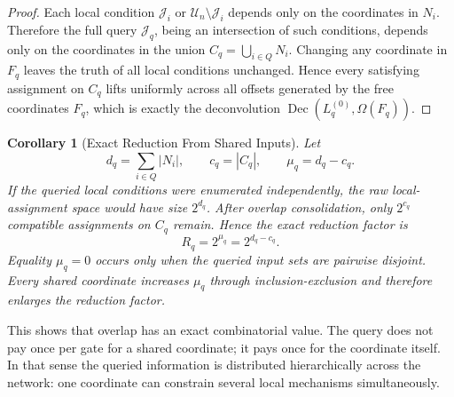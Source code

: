 \documentclass[11pt]{article}
\newtheorem{corollary}{Corollary}
\theoremstyle{definition}
\newcommand{\U}{\mathcal{U}_n}
\newcommand{\J}{\mathcal{J}}
\begin{document}
\begin{proof}
Each local condition \(\J_i\) or \(\U\setminus\J_i\) depends only on the coordinates in \(N_i\). 
Therefore the full query \(\J_q\), being an intersection of such conditions, depends 
only on the coordinates in the union \(C_q=\bigcup_{i\in Q}N_i\). 
Changing any coordinate in \(F_q\) leaves the truth of all local conditions unchanged. 
Hence every satisfying assignment on \(C_q\) lifts uniformly across all offsets 
generated by the free coordinates \(F_q\), which is exactly the 
deconvolution \(\operatorname{Dec}(L_q^{(0)},\Omega(F_q))\).
\end{proof}

\begin{corollary}[Exact Reduction From Shared Inputs]\label{cor:shared-input-reduction}
Let
\[
d_q=\sum_{i\in Q}|N_i|,
\qquad
c_q=|C_q|,
\qquad
\mu_q=d_q-c_q.
\]
If the queried local conditions were enumerated independently, the raw 
local-assignment space would 
have size \(2^{d_q}\). After overlap consolidation, 
only \(2^{c_q}\) compatible assignments on \(C_q\) remain. 
Hence the exact reduction factor is
\[
R_q=2^{\mu_q}=2^{d_q-c_q}.
\]
Equality \(\mu_q=0\) occurs only when the queried input sets are pairwise disjoint. Every shared coordinate increases \(\mu_q\) through inclusion-exclusion and therefore enlarges the reduction factor.
\end{corollary}

This shows that overlap has an exact combinatorial value. The query does not pay once
 per gate for a shared coordinate; it pays once for the coordinate itself. In
 that sense the queried information is distributed hierarchically across the network: 
 one coordinate can constrain several local mechanisms simultaneously. 
 
\end{document}
